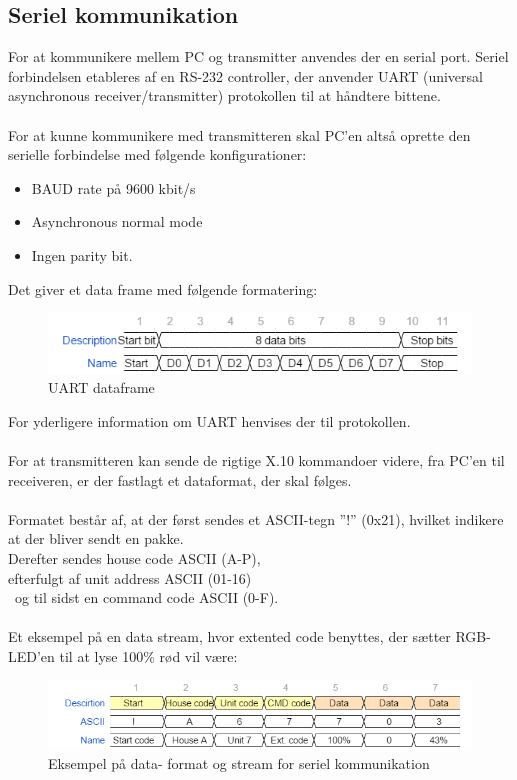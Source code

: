 \documentclass[oneside]{memoir}
\begin{document}
\subsection{Seriel kommunikation}
For at kommunikere mellem PC og transmitter anvendes der en serial port. Seriel forbindelsen etableres af en RS-232 controller, der anvender UART (universal asynchronous receiver/transmitter) protokollen til at håndtere bittene. \\\\
For at kunne kommunikere med transmitteren skal PC’en altså oprette den serielle forbindelse med følgende konfigurationer:
\begin{itemize}
	\item BAUD rate på 9600 kbit/s
	\item Asynchronous normal mode 
	\item Ingen parity bit.
\end{itemize}

Det giver et data frame med følgende formatering:
\begin{figure}[H]
\centering
\includegraphics[scale=0.5]{"billeder til latex/UART-frame"}
\caption{UART dataframe}
\label{fig:UART-1}
\end{figure}
For yderligere information om UART henvises der til protokollen.\\\\
For at transmitteren kan sende de rigtige X.10 kommandoer videre, fra PC’en til receiveren, er der fastlagt et dataformat, der skal følges. \\\\
Formatet består af, at der først sendes et ASCII-tegn ”!” (0x21), hvilket indikere at der bliver sendt en pakke. \\
Derefter sendes house code ASCII (A-P),\\
efterfulgt af unit address ASCII (01-16) \\\
og til sidst en command code ASCII (0-F).
\\\\
Et eksempel på en data stream, hvor extented code benyttes,  der sætter RGB-LED’en til at lyse 100\% rød vil være:
\begin{figure}[H]
	\centering
	\includegraphics[scale=0.5]{"billeder til latex/Serial kommunikkation"}
	\caption{Eksempel på data- format og stream for seriel kommunikation}
	\label{fig:UART-2}
\end{figure}
\newpage
\end{document}
